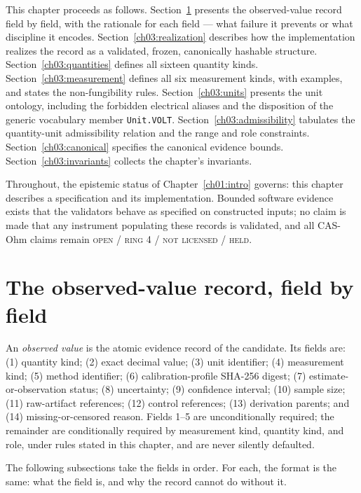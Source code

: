 This chapter proceeds as follows. Section~\ref{ch03:record} presents the observed-value record field by field, with the rationale for each field --- what failure it prevents or what discipline it encodes. Section~\ref{ch03:realization} describes how the implementation realizes the record as a validated, frozen, canonically hashable structure. Section~\ref{ch03:quantities} defines all sixteen quantity kinds. Section~\ref{ch03:measurement} defines all six measurement kinds, with examples, and states the non-fungibility rules. Section~\ref{ch03:units} presents the unit ontology, including the forbidden electrical aliases and the disposition of the generic vocabulary member \texttt{Unit.VOLT}. Section~\ref{ch03:admissibility} tabulates the quantity-unit admissibility relation and the range and role constraints. Section~\ref{ch03:canonical} specifies the canonical evidence bounds. Section~\ref{ch03:invariants} collects the chapter's invariants.

Throughout, the epistemic status of Chapter~\ref{ch01:intro} governs: this chapter describes a specification and its implementation. Bounded software evidence exists that the validators behave as specified on constructed inputs; no claim is made that any instrument populating these records is validated, and all CAS-Ohm claims remain \textsc{open / ring 4 / not licensed / held}.

\section{The observed-value record, field by field}\label{ch03:record}

\begin{definition}\label{ch03:def:observed}
An \emph{observed value} is the atomic evidence record of the candidate. Its fields are: (1) quantity kind; (2) exact decimal value; (3) unit identifier; (4) measurement kind; (5) method identifier; (6) calibration-profile SHA-256 digest; (7) estimate-or-observation status; (8) uncertainty; (9) confidence interval; (10) sample size; (11) raw-artifact references; (12) control references; (13) derivation parents; and (14) missing-or-censored reason. Fields 1--5 are unconditionally required; the remainder are conditionally required by measurement kind, quantity kind, and role, under rules stated in this chapter, and are never silently defaulted.
\end{definition}

The following subsections take the fields in order. For each, the format is the same: what the field is, and why the record cannot do without it.

